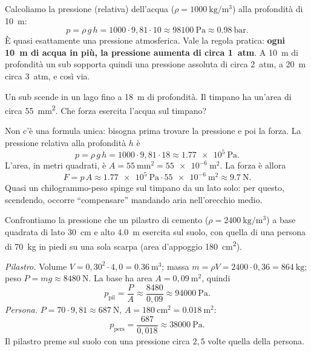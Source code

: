 \begin{testexample}
Calcoliamo la pressione (relativa) dell'acqua ($\rho = \SI{1000}{\kilo\gram\per\metre\cubed}$) alla profondità di \SI{10}{\metre}:
\[ p = \rho\,g\,h = 1000 \cdot 9{,}81 \cdot 10 \approx \SI{98100}{\pascal} \approx \SI{0,98}{\bar}. \]
È quasi esattamente una pressione atmosferica. Vale la regola pratica: \textbf{ogni \SI{10}{\metre} di acqua in più, la pressione aumenta di circa \SI{1}{atm}}. A \SI{10}{\metre} di profondità un sub sopporta quindi una pressione assoluta di circa \SI{2}{atm}, a \SI{20}{\metre} circa \SI{3}{atm}, e così via.
\end{testexample}

\begin{testexample}
Un sub scende in un lago fino a \SI{18}{\metre} di profondità. Il timpano ha un'area di circa \SI{55}{\milli\metre\squared}. Che forza esercita l'acqua sul timpano?

Non c'è una formula unica: bisogna prima trovare la pressione e poi la forza. La pressione relativa alla profondità $h$ è
\[ p = \rho\,g\,h = 1000 \cdot 9{,}81 \cdot 18 \approx \SI{1,77e5}{\pascal}. \]
L'area, in metri quadrati, è $A = \SI{55}{\milli\metre\squared} = \SI{55e-6}{\metre\squared}$. La forza è allora
\[ F = p\,A \approx \SI{1,77e5}{\pascal} \cdot \SI{55e-6}{\metre\squared} \approx \SI{9,7}{\newton}. \]
Quasi un chilogrammo-peso spinge sul timpano da un lato solo: per questo, scendendo, occorre ``compensare'' mandando aria nell'orecchio medio.
\end{testexample}

\begin{testexample}
Confrontiamo la pressione che un pilastro di cemento ($\rho = \SI{2400}{\kilo\gram\per\metre\cubed}$) a base quadrata di lato \SI{30}{\centi\metre} e alto \SI{4,0}{\metre} esercita sul suolo, con quella di una persona di \SI{70}{\kilo\gram} in piedi su una sola scarpa (area d'appoggio \SI{180}{\centi\metre\squared}).

\emph{Pilastro.} Volume $V = 0{,}30^2 \cdot 4{,}0 = \SI{0,36}{\metre\cubed}$; massa $m = \rho V = 2400 \cdot 0{,}36 = \SI{864}{\kilo\gram}$; peso $P = mg \approx \SI{8480}{\newton}$. La base ha area $A = 0{,}09\ \si{\metre\squared}$, quindi
\[ p_\text{pil} = \frac{P}{A} \approx \frac{8480}{0{,}09} \approx \SI{94000}{\pascal}. \]
\emph{Persona.} $P = 70 \cdot 9{,}81 \approx \SI{687}{\newton}$, $A = \SI{180}{\centi\metre\squared} = \SI{0,018}{\metre\squared}$:
\[ p_\text{pers} = \frac{687}{0{,}018} \approx \SI{38000}{\pascal}. \]
Il pilastro preme sul suolo con una pressione circa $2{,}5$ volte quella della persona.
\end{testexample}

